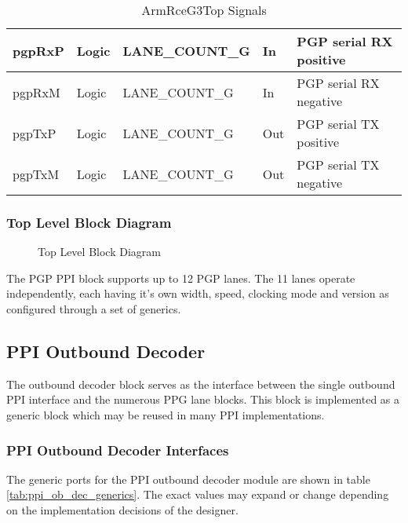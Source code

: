 \documentclass[11pt]{article}
\begin{document}
\begin{table}[H]
\begin{tabular}{| l | l | l | l | l | }
      \hline pgpRxP            & Logic             & LANE\_COUNT\_G     & In        & PGP serial RX positive     \\
      \hline pgpRxM            & Logic             & LANE\_COUNT\_G     & In        & PGP serial RX negative     \\
      \hline pgpTxP            & Logic             & LANE\_COUNT\_G     & Out       & PGP serial TX positive     \\
      \hline pgpTxM            & Logic             & LANE\_COUNT\_G     & Out       & PGP serial TX negative     \\
      \hline
   \end{tabular}
   \caption{ArmRceG3Top Signals}
   \label{tab:top_signals}
\end{table}

\subsubsection{Top Level Block Diagram}

\begin{figure}[H]
   \centering
   \caption{Top Level Block Diagram}
   \label{fig:top_level_block}
\end{figure}

The PGP PPI block supports up to 12 PGP lanes. The 11 lanes operate independently, each having it's own width, speed, clocking
mode and version as configured through a set of generics.

\subsection{PPI Outbound Decoder}
\label{subsec:ppi_ob_dec}

The outbound decoder block serves as the interface between the single outbound PPI interface and the numerous 
PPG lane blocks. This block is implemented as a generic block which may be reused in many PPI implementations.

\subsubsection{PPI Outbound Decoder Interfaces}

The generic ports for the PPI outbound decoder module are shown in table \ref{tab:ppi_ob_dec_generics}. 
The exact values may expand or change depending on the implementation decisions  of the
designer. 
\end{document}
